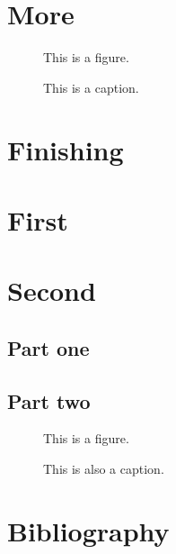 \documentclass{utthesis}
\begin{document}
\chapter{More}
\lipsum[3]
\begin{figure}
This is a figure.
\caption[This]{This is a caption.}
\end{figure}

\chapter{Finishing}
\lipsum[3]

\begin{appendix}

\chapter{First}
\lipsum[3]

\chapter{Second}
\section{Part one}
\lipsum[3]
\section{Part two}
\begin{figure}
This is a figure.
\caption[That]{This is also a caption.}
\end{figure}

\end{appendix}

\backmatter

\printindex

\cleardoublepage
{}
{}
\chapter*{Bibliography}
\lipsum[2]
\end{document}
